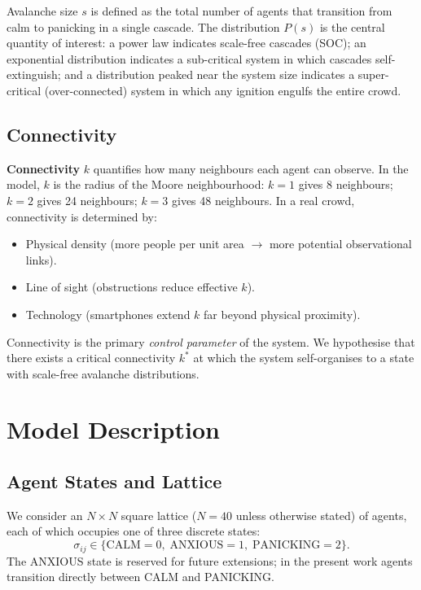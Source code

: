 \documentclass[12pt, a4paper]{article}
\begin{document}
Avalanche size $s$ is defined as the total number of agents that transition from
calm to panicking in a single cascade.  The distribution $P(s)$ is the central
quantity of interest: a power law indicates scale-free cascades (SOC); an
exponential distribution indicates a sub-critical system in which cascades
self-extinguish; and a distribution peaked near the system size indicates a
super-critical (over-connected) system in which any ignition engulfs the entire
crowd.

\subsection{Connectivity}

\textbf{Connectivity} $k$ quantifies how many neighbours each agent can observe.
In the model, $k$ is the radius of the Moore neighbourhood: $k=1$ gives 8
neighbours; $k=2$ gives 24 neighbours; $k=3$ gives 48 neighbours.  In a real
crowd, connectivity is determined by:
\begin{itemize}
  \item Physical density (more people per unit area $\rightarrow$ more potential
        observational links).
  \item Line of sight (obstructions reduce effective $k$).
  \item Technology (smartphones extend $k$ far beyond physical proximity).
\end{itemize}
Connectivity is the primary \emph{control parameter} of the system.  We
hypothesise that there exists a critical connectivity $k^*$ at which the system
self-organises to a state with scale-free avalanche distributions.

\section{Model Description}
\label{sec:model}

\subsection{Agent States and Lattice}

We consider an $N\times N$ square lattice ($N=40$ unless otherwise stated) of
agents, each of which occupies one of three discrete states:
\begin{equation}
  \sigma_{ij} \in \{\text{CALM}=0,\;\text{ANXIOUS}=1,\;\text{PANICKING}=2\}.
\end{equation}
The ANXIOUS state is reserved for future extensions; in the present work agents
transition directly between CALM and PANICKING.
\end{document}
